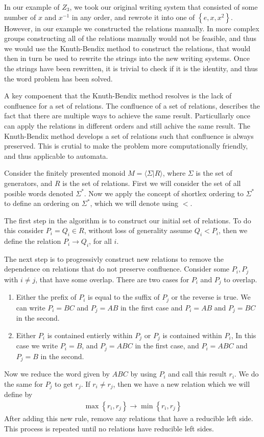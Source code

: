 \documentclass[10pt]{amsart}
\theoremstyle{definition}
\begin{document}
In our example of $Z_3$, we took our original writing system that consisted of
some number of $x$ and $x^{-1}$ in any order, and rewrote it into one of
$\left\{e, x, x^2\right\}$. However, in our example we constructed the
relations manually. In more complex groups constructing all of the relations
manually would not be feasible, and thus we would use the Knuth-Bendix method
to construct the relations, that would then in turn be used to rewrite the
strings into the new writing systems. Once the strings have been rewritten, it
is trivial to check if it is the identity, and thus the word problem has been
solved.

A key compoenent that the Knuth-Bendix method resolves is the lack of
confluence for a set of relations. The confluence of a set of relations,
describes the fact that there are multiple ways to achieve the same result.
Particullarly once can apply the relations in different orders and still achive
the same result. The Knuth-Bendix method develops a set of relations such that
confluence is always preserved. This is crutial to make the problem more
computationally friendly, and thus applicable to automata.

Consider the finitely presented monoid $M=\langle \Sigma\vert R\rangle$, where
$\Sigma$ is the set of generators, and $R$ is the set of relations. First we
will consider the set of all posible words denoted $\Sigma^*$. Now we apply the
concept of shortlex ordering to $\Sigma^*$ to define an ordering on $\Sigma^*$,
which we will denote using $<$.

The first step in the algorithm is to construct our initial set of relations.
To do this consider $P_i=Q_i\in R$, without loss of generality assume
$Q_i<P_i$, then we define the relation $P_i\rightarrow Q_i$, for all $i$.

The next step is to progressivly construct new relations to remove the
dependence on relations that do not preserve confluence. Consider some
$P_i,P_j$ with $i\neq j$, that have some overlap. There are two cases for $P_i$
and $P_j$ to overlap.
\begin{enumerate}
  \item Either the prefix of $P_i$ is equal to the suffix of $P_j$ or the
    reverse is true. We can write $P_i=BC$ and $P_j=AB$ in the first case and
    $P_i=AB$ and $P_j=BC$ in the second.
  \item Either $P_i$ is contained entierly within $P_j$ or $P_j$ is contained
    within $P_i$, In this case we write $P_i=B$, and $P_j=ABC$ in the first
    case, and $P_i=ABC$ and $P_j=B$ in the second.
\end{enumerate}
Now we reduce the word given by $ABC$ by using $P_i$ and call this result
$r_i$. We do the same for $P_j$ to get $r_j$. If $r_i\neq r_j$, then we have a
new relation which we will define by
\begin{align*}
  \max\left\{r_i,r_j\right\}\rightarrow\min\left\{r_i,r_j\right\}
\end{align*}
After adding this new rule, remove any relations that have a reducible left
side. This process is repeated until no relations have reducible left sides.
\end{document}
